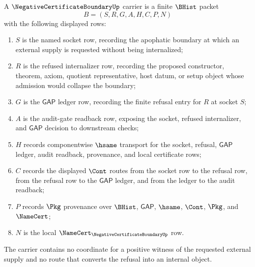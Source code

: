 \begin{definition}
\label{def:negative-certificate-boundary-carrier}
A $\NegativeCertificateBoundaryUp$ carrier is a finite $\BHist$ packet
$$
B=(S,R,G,A,H,C,P,N)
$$
with the following displayed rows:
\begin{enumerate}
\item $S$ is the named socket row, recording the apophatic boundary at which an external supply is requested without being internalized;
\item $R$ is the refused internalizer row, recording the proposed constructor, theorem, axiom, quotient representative, host datum, or setup object whose admission would collapse the boundary;
\item $G$ is the $\mathsf{GAP}$ ledger row, recording the finite refusal entry for $R$ at socket $S$;
\item $A$ is the audit-gate readback row, exposing the socket, refused internalizer, and $\mathsf{GAP}$ decision to downstream checks;
\item $H$ records componentwise $\hsame$ transport for the socket, refusal, $\mathsf{GAP}$ ledger, audit readback, provenance, and local certificate rows;
\item $C$ records the displayed $\Cont$ routes from the socket row to the refusal row, from the refusal row to the $\mathsf{GAP}$ ledger, and from the ledger to the audit readback;
\item $P$ records $\Pkg$ provenance over $\BHist$, $\mathsf{GAP}$, $\hsame$, $\Cont$, $\Pkg$, and $\NameCert$;
\item $N$ is the local $\NameCert_{\NegativeCertificateBoundaryUp}$ row.
\end{enumerate}
The carrier contains no coordinate for a positive witness of the requested external supply and no route that converts the refusal into an internal object.
\end{definition}

